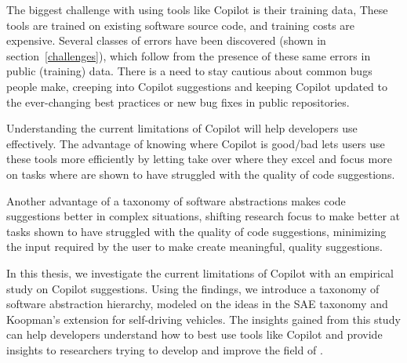 The biggest challenge with using tools like Copilot is their training data, These tools are trained on existing software source code, and training costs are expensive.
Several classes of errors have been discovered (shown in section~\ref{challenges}), which follow from the presence of these same errors in public (training) data. There is a need to stay cautious about common bugs people make, creeping into Copilot suggestions and keeping Copilot updated to the ever-changing best practices or new bug fixes in public repositories.

Understanding the current limitations of Copilot will help developers use \cct{} effectively. The advantage of knowing where Copilot is good/bad lets users use these tools more efficiently by letting \cct{} take over where they excel and focus more on tasks where \cct{} are shown to have struggled with the quality of code suggestions.

Another advantage of a taxonomy of software abstractions makes code suggestions better in complex situations, shifting research focus to make \cct{} better at tasks shown to have struggled with the quality of code suggestions, minimizing the input required by the user to make \cct{} create meaningful, quality suggestions.

In this thesis, we investigate the current limitations of Copilot with an empirical study on Copilot suggestions. Using the findings, we introduce a taxonomy of software abstraction hierarchy, modeled on the ideas in the SAE taxonomy and Koopman's extension for self-driving vehicles. The insights gained from this study can help developers understand how to best use tools like Copilot and provide insights to researchers trying to develop and improve the field of \cct{}.




